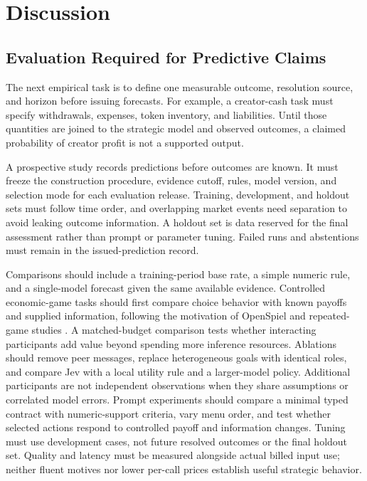 \section{Discussion}\label{sec:discussion}
\subsection{Evaluation Required for Predictive Claims}\label{sec:future}
The next empirical task is to define one measurable outcome, resolution source,
and horizon before issuing forecasts. For example, a creator-cash task must
specify withdrawals, expenses, token inventory, and liabilities. Until those
quantities are joined to the strategic model and observed outcomes, a claimed
probability of creator profit is not a supported output.

A prospective study records predictions before outcomes are known. It must
freeze the construction procedure, evidence cutoff, rules, model version, and
selection mode for each evaluation release. Training, development, and holdout
sets must follow time order, and overlapping market events need separation to
avoid leaking outcome information. A holdout set is data reserved for the final
assessment rather than prompt or parameter tuning. Failed runs and abstentions
must remain in the issued-prediction record.

Comparisons should include a training-period base rate, a simple numeric rule,
and a single-model forecast given the same available evidence. Controlled economic-game tasks should first compare choice behavior with known
payoffs and supplied information, following the motivation of OpenSpiel and
repeated-game studies \cite{lanctot2019,akata2025}. A matched-budget
comparison tests whether interacting participants add value beyond spending
more inference resources. Ablations should remove peer messages, replace
heterogeneous goals with identical roles, and compare Jev with a local utility
rule and a larger-model policy. Additional participants are not independent
observations when they share assumptions or correlated model errors. Prompt
experiments should compare a minimal typed contract with numeric-support
criteria, vary menu order, and test whether selected actions respond to
controlled payoff and information changes. Tuning must use development cases,
not future resolved outcomes or the final holdout set. Quality and latency
must be measured alongside actual billed input use; neither fluent motives
nor lower per-call prices establish useful strategic behavior.

